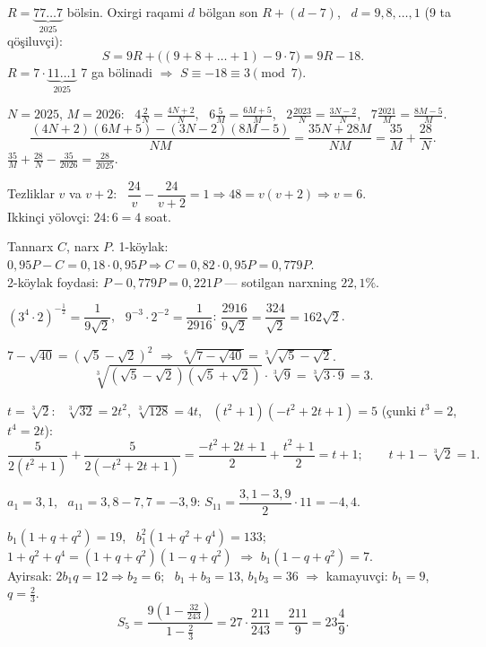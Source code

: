 




$R=\underbrace{77\ldots7}_{2025}$ bölsin. Oxirgi raqami $d$ bölgan son $R+(d-7)$, \ $d=9,8,\dots,1$ (9 ta qöşiluvçi):
\[S=9R+\bigl((9+8+\dots+1)-9\cdot7\bigr)=9R-18.\]
$R=7\cdot\underbrace{11\ldots1}_{2025}$ 7 ga bölinadi $\Rightarrow$ $S\equiv-18\equiv3\pmod7$.

$N=2025$, $M=2026$: \ $4\frac2N=\frac{4N+2}N$, \ $6\frac5M=\frac{6M+5}M$, \ $2\frac{2023}N=\frac{3N-2}N$, \ $7\frac{2021}M=\frac{8M-5}M$.
\[\frac{(4N+2)(6M+5)-(3N-2)(8M-5)}{NM}=\frac{35N+28M}{NM}=\frac{35}M+\frac{28}N.\]
$\frac{35}M+\frac{28}N-\frac{35}{2026}=\frac{28}{2025}$.

Tezliklar $v$ va $v+2$: \ $\dfrac{24}v-\dfrac{24}{v+2}=1\Rightarrow48=v(v+2)\Rightarrow v=6$.\\
Ikkinçi yölovçi: $24:6=4$ soat.

Tannarx $C$, narx $P$. 1-köylak: $0{,}95P-C=0{,}18\cdot0{,}95P\Rightarrow C=0{,}82\cdot0{,}95P=0{,}779P$.\\
2-köylak foydasi: $P-0{,}779P=0{,}221P$ — sotilgan narxning $22{,}1\%$.

$(3^4\cdot2)^{-\frac12}=\dfrac1{9\sqrt2}$, \ $9^{-3}\cdot2^{-2}=\dfrac1{2916}$: \quad $\dfrac{2916}{9\sqrt2}=\dfrac{324}{\sqrt2}=162\sqrt2$.

$7-\sqrt{40}=(\sqrt5-\sqrt2)^2$ $\Rightarrow$ $\sqrt[6]{7-\sqrt{40}}=\sqrt[3]{\sqrt5-\sqrt2}$.
\[\sqrt[3]{(\sqrt5-\sqrt2)(\sqrt5+\sqrt2)}\cdot\sqrt[3]9=\sqrt[3]{3\cdot9}=3.\]

$t=\sqrt[3]2$: \ $\sqrt[3]{32}=2t^2$, $\sqrt[3]{128}=4t$, \ $(t^2+1)(-t^2+2t+1)=5$ (çunki $t^3=2$, $t^4=2t$):
\[\frac5{2(t^2+1)}+\frac5{2(-t^2+2t+1)}=\frac{-t^2+2t+1}2+\frac{t^2+1}2=t+1;\qquad t+1-\sqrt[3]2=1.\]

$a_1=3{,}1$, \ $a_{11}=3{,}8-7{,}7=-3{,}9$: \quad $S_{11}=\dfrac{3{,}1-3{,}9}2\cdot11=-4{,}4$.

$b_1(1+q+q^2)=19$, \ $b_1^2(1+q^2+q^4)=133$; \ $1+q^2+q^4=(1+q+q^2)(1-q+q^2)$ $\Rightarrow$ $b_1(1-q+q^2)=7$.\\
Ayirsak: $2b_1q=12\Rightarrow b_2=6$; \ $b_1+b_3=13$, $b_1b_3=36$ $\Rightarrow$ kamayuvçi: $b_1=9$, $q=\frac23$.
\[S_5=\frac{9\left(1-\frac{32}{243}\right)}{1-\frac23}=27\cdot\frac{211}{243}=\frac{211}9=23\frac49.\]

